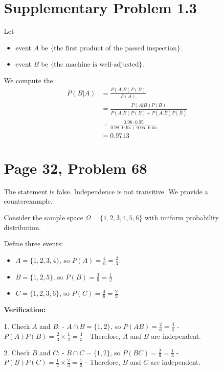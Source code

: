 \documentclass[a4paper, UTF-8]{article}
\theoremstyle{plain}
\begin{document}
\section{Supplementary Problem 1.3}

Let 

\begin{itemize}
  \item event $A$ be $\{\text{the first product of the passed inspection}\}$.
  \item event $B$ be $\{\text{the machine is well-adjusted}\}$.
\end{itemize}

We compute the 
\begin{align*}
P(B|A) &= \frac{P(A|B)P(B)}{P(A)} \\
       &= \frac{P(A|B)P(B)}{P(A|B)P(B) + P(A|\bar{B})P(\bar{B})} \\
       &= \frac{0.98\cdot 0.95}{0.98\cdot 0.95 + 0.05\cdot 0.55}\\
       &= 0.9713
\end{align*}

\section{Page 32, Problem 68}

The statement is false. Independence is not transitive. We provide a counterexample.

Consider the sample space $\Omega = \{1, 2, 3, 4, 5, 6\}$ with uniform probability distribution.

Define three events:
\begin{itemize}
    \item $A = \{1, 2, 3, 4\}$, so $P(A) = \frac{4}{6} = \frac{2}{3}$
    \item $B = \{1, 2, 5\}$, so $P(B) = \frac{3}{6} = \frac{1}{2}$
    \item $C = \{1, 2, 3, 6\}$, so $P(C) = \frac{4}{6} = \frac{2}{3}$
\end{itemize}

\textbf{Verification:}

1. Check $A$ and $B$:
   - $A \cap B = \{1, 2\}$, so $P(AB) = \frac{2}{6} = \frac{1}{3}$
   - $P(A)P(B) = \frac{2}{3} \times \frac{1}{2} = \frac{1}{3}$
   - Therefore, $A$ and $B$ are independent.

2. Check $B$ and $C$:
   - $B \cap C = \{1, 2\}$, so $P(BC) = \frac{2}{6} = \frac{1}{3}$
   - $P(B)P(C) = \frac{1}{2} \times \frac{2}{3} = \frac{1}{3}$
   - Therefore, $B$ and $C$ are independent.
\end{document}
